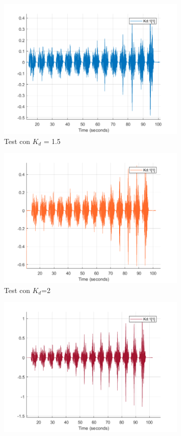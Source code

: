 \begin{figure}[!ht]
\begin{subfigure}{.5\textwidth}
  \centering
  \includegraphics[width=.8\linewidth]{Immagini/Sperimentale/Test_Kd=15.png}  
  \caption{Test con $K_d$ = 1.5}
  \label{fig:sub-kd1.5}
\end{subfigure}
\begin{subfigure}{.5\textwidth}
  \centering
  \includegraphics[width=.8\linewidth]{Immagini/Sperimentale/Test_Kd=2.png}  
  \caption{Test con $K_d$=2}
  \label{fig:sub-kd2}
\end{subfigure}
\begin{subfigure}{.5\textwidth}
  \centering
  \includegraphics[width=.8\linewidth]{Immagini/Sperimentale/Test_Kd=3.png}  

\end{subfigure}
\end{figure}
